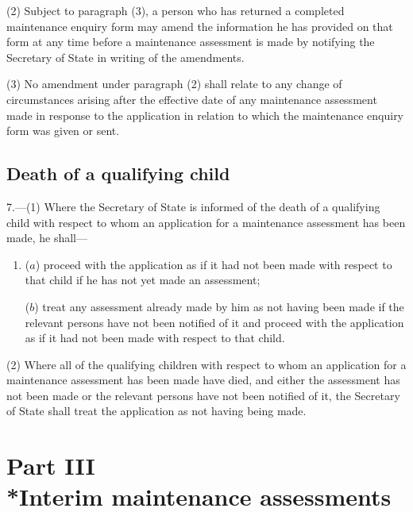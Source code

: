 \documentclass[a4paper,12pt]{article}
\begin{document}
(2) Subject to paragraph (3), a person who has returned a completed maintenance enquiry form may amend the information he has provided on that form at any time before a maintenance assessment is made by notifying the Secretary of State in writing of the amendments.

(3) No amendment under paragraph (2) shall relate to any change of circumstances arising after the effective date of any maintenance assessment made in response to the application in relation to which the maintenance enquiry form was given or sent.

\subsection[7. Death of a qualifying child]{Death of a qualifying child}

7.—(1) Where 
the Secretary of State  %
is informed of the death of a qualifying child with respect to whom an application for a maintenance assessment has been made, he shall—
\begin{enumerate}\item[]
($a$) proceed with the application as if it had not been made with respect to that child if he has not yet made an assessment;

($b$) treat any assessment already made by him as not having been made if the relevant persons have not been notified of it and proceed with the application as if it had not been made with respect to that child.
\end{enumerate}

(2) Where all of the qualifying children with respect to whom an application for a maintenance assessment has been made have died, and either the assessment has not been made or the relevant persons have not been notified of it, 
the Secretary of State  %
shall treat the application as not having being made.


\section[Part III --- Interim maintenance assessments]{Part III\\*Interim maintenance assessments}
\end{document}
